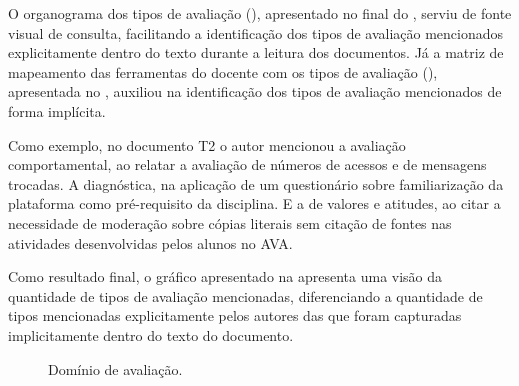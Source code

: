 O organograma dos tipos de avaliação (), apresentado no final do , serviu de fonte visual de consulta, facilitando a identificação dos tipos de avaliação mencionados explicitamente dentro do texto durante a leitura dos documentos. Já a matriz de mapeamento das ferramentas do docente com os tipos de avaliação (), apresentada no , auxiliou na identificação dos tipos de avaliação mencionados de forma implícita.

Como exemplo, no documento T2 o autor mencionou a avaliação comportamental, ao relatar a avaliação de números de acessos e de mensagens trocadas. A diagnóstica, na aplicação de um questionário sobre familiarização da plataforma como pré-requisito da disciplina. E a de valores e atitudes, ao citar a necessidade de moderação sobre cópias literais sem citação de fontes nas atividades desenvolvidas pelos alunos no AVA. 


Como resultado final, o gráfico apresentado na  apresenta uma visão da quantidade de tipos de avaliação mencionadas, diferenciando a quantidade de tipos mencionadas explicitamente pelos autores das que foram capturadas implicitamente dentro do texto do documento.

\begin{figure}[ht!]
    \centering
    \label{fig:t-aval}
    \caption{Domínio de avaliação.}
    \vspace{2mm}
\end{figure}

